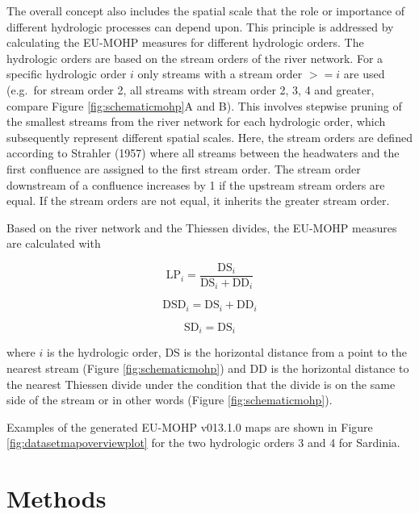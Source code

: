 \documentclass[fleqn,10pt]{wlscirep}
\begin{document}
The overall concept also includes the spatial scale that the role or importance of different hydrologic processes can depend upon. This principle is addressed by calculating the EU-MOHP\cite{nolscher_eu-mohp_2021-1} measures for different hydrologic orders. The hydrologic orders are based on the stream orders of the river network. For a specific hydrologic order \(i\) only streams with a stream order \(>= i\) are used (e.g.~for stream order 2, all streams with stream order 2, 3, 4 and greater, compare Figure \ref{fig:schematicmohp}A and B). This involves stepwise pruning of the smallest streams from the river network for each hydrologic order, which subsequently represent different spatial scales. Here, the stream orders are defined according to Strahler (1957)\cite{strahler_quantitative_1957} where all streams between the headwaters and the first confluence are assigned to the first stream order. The stream order downstream of a confluence increases by 1 if the upstream stream orders are equal. If the stream orders are not equal, it inherits the greater stream order.

Based on the river network and the Thiessen divides, the EU-MOHP\cite{nolscher_eu-mohp_2021-1} measures are calculated with

\begin{equation}
\text{LP}_i = \frac{\text{DS}_i}{\text{DS}_i + \text{DD}_i} \label{eq:eqlp}
\end{equation}

\begin{equation}
\text{DSD}_i = \text{DS}_i + \text{DD}_i \label{eq:eqdsd}
\end{equation}

\begin{equation}
\text{SD}_i = \text{DS}_i \label{eq:eqsd}
\end{equation}

\noindent
where \(i\) is the hydrologic order, DS is the horizontal distance from a point to the nearest stream (Figure \ref{fig:schematicmohp}) and DD is the horizontal distance to the nearest Thiessen divide under the condition that the divide is on the same side of the stream or in other words (Figure \ref{fig:schematicmohp}).

Examples of the generated EU-MOHP v013.1.0\cite{nolscher_eu-mohp_2021-1} maps are shown in Figure \ref{fig:datasetmapoverviewplot} for the two hydrologic orders 3 and 4 for Sardinia.

\hypertarget{methods}{%
\section*{Methods}\label{methods}}
\end{document}
